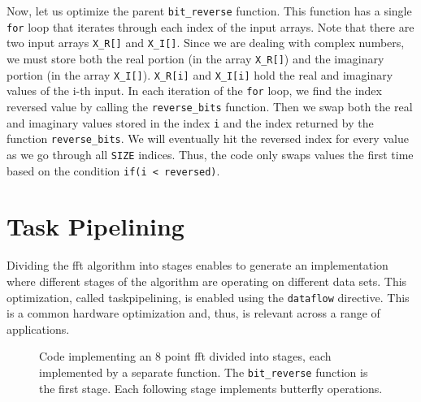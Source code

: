 Now, let us optimize the parent \lstinline|bit_reverse| function. This function has a single \lstinline{for} loop that iterates through each index of the input arrays. Note that there are two input arrays \lstinline{X_R[]} and \lstinline{X_I[]}. Since we are dealing with complex numbers, we must store both the real portion (in the array \lstinline{X_R[]}) and the imaginary portion (in the array \lstinline{X_I[]}). \lstinline{X_R[i]} and \lstinline{X_I[i]} hold the real and imaginary values of the i-th input.
In each iteration of the \lstinline{for} loop, we find the index reversed value by calling the \lstinline{reverse_bits} function. Then we swap both the real and imaginary values stored in the index \lstinline{i} and the index returned by the function \lstinline{reverse_bits}. We will eventually hit the reversed index for every value as we go through all \lstinline{SIZE} indices. Thus, the code only swaps values the first time based on the condition \lstinline{if(i < reversed)}.


\section{Task Pipelining}
\label{sec:fft_task_pipelining}

Dividing the \gls{fft} algorithm into stages enables \VHLS to generate an implementation where different stages of the algorithm are operating on different data sets. This optimization, called \gls{taskpipelining}, is enabled using the \lstinline{dataflow} directive. This is a common hardware optimization and, thus, is relevant across a range of applications.

\begin{figure}

\caption{Code implementing an 8 point \gls{fft} divided into stages, each implemented by a separate function. The \lstinline{bit_reverse} function is the first stage. Each following stage implements butterfly operations. }
\label{fig:fft_stages_code}
\end{figure}

